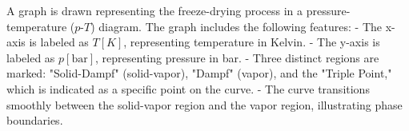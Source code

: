 A graph is drawn representing the freeze-drying process in a pressure-temperature (\(p\)-\(T\)) diagram. The graph includes the following features:  
- The x-axis is labeled as \(T [K]\), representing temperature in Kelvin.  
- The y-axis is labeled as \(p [\text{bar}]\), representing pressure in bar.  
- Three distinct regions are marked: "Solid-Dampf" (solid-vapor), "Dampf" (vapor), and the "Triple Point," which is indicated as a specific point on the curve.  
- The curve transitions smoothly between the solid-vapor region and the vapor region, illustrating phase boundaries.